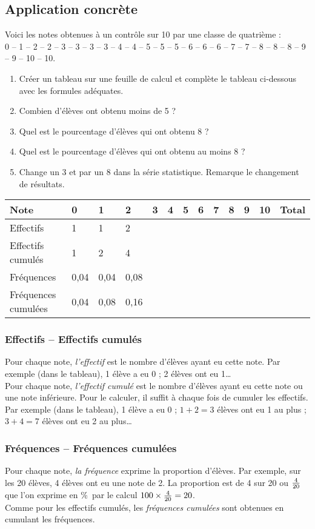 \subsection*{Application concrète}

Voici les notes obtenues à un contrôle sur 10 par une classe de quatrième :\\
0 -- 1 -- 2 -- 2 -- 3 -- 3 -- 3 -- 3 -- 4 -- 4 -- 5 -- 5 -- 5 -- 6 -- 6 -- 6 -- 7 -- 7 -- 8 -- 8 -- 8 -- 9 -- 9 -- 10 -- 10.

\begin{enumerate}
\item Créer un tableau sur une feuille de calcul et complète le tableau ci-dessous avec les formules adéquates.
\item Combien d'élèves ont obtenu moins de 5 ?
\item Quel est le pourcentage d'élèves qui ont obtenu 8 ?
\item Quel est le pourcentage d'élèves qui ont obtenu au moins 8 ?
\item Change un 3 et par un 8 dans la série statistique. Remarque le changement de résultats.
\end{enumerate}

\begin{tabular}{|p{4.2cm}*{11}{|p{5mm}}|p{8mm}|}
\hline
Note&0 & 1 & 2& 3 & 4 & 5 & 6&7 &8 &9 &10&Total \\
\hline
Effectifs&1 & 1 & 2& &&&& & &&& \\
\hline
Effectifs cumulés&1 & 2 & 4& &  & & & && & & \\
\hline
Fréquences &0,04 & 0,04 & 0,08 & &  & & & & & & & \\
\hline
Fréquences cumulées &0,04  & 0,08  & 0,16  &  &  & & & & & & & \\
\hline
\end{tabular}




\subsubsection*{Effectifs -- Effectifs cumulés}
	Pour chaque note, {\em l'effectif} est le nombre d'élèves ayant eu cette note.	Par exemple (dans le tableau), 1 élève a eu 0 ;	2 élèves ont eu 1\dots\\ 
	Pour chaque note, {\em l'effectif cumulé} est le nombre d'élèves ayant eu cette note ou une note inférieure. Pour le calculer, il suffit à chaque fois de cumuler les effectifs.\\
	Par exemple (dans le tableau), 1 élève a eu 0 ;	$1+2=3$ élèves ont eu 1 au plus ; $3+4=7$ élèves ont eu 2 au plus\dots
	
\subsubsection*{Fréquences -- Fréquences cumulées}
	Pour chaque note, {\em la fréquence} exprime la proportion d'élèves. Par exemple, sur les 20 élèves, 4 élèves ont eu une note de 2.
	La proportion est de 4 sur 20 ou $4\over20$ que l'on exprime en \%\ par le calcul $100\times{4\over20}=20$.\\
	Comme pour les effectifs cumulés, les {\em fréquences cumulées}	sont obtenues en cumulant les fréquences.